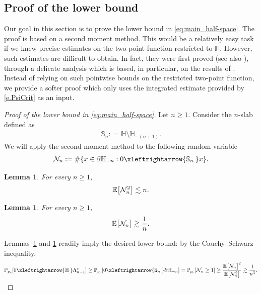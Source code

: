 \documentclass[11pt,a4paper]{article}
\numberwithin{equation}{section}
\theoremstyle{plain}
\newtheorem{Lem}[Thm]{Lemma}
\theoremstyle{definition}
\newcommand{\connect}{\xleftrightarrow}
\newcommand{\1}{\mathbf 1}
\def\H{\mathbb{H}}
\def\P{\mathbb{P}} %
\def\E{\mathbb{E}} %
\def\md{\mid}
\def\Bb#1#2{{\def\md{\bigm| }#1\bigl[#2\bigr]}}
\def\Eb{\Bb\E}
\def \p {{\partial}}
\def\bf{\bfseries}
\begin{document}
\subsection{Proof of the lower bound}

Our goal in this section is to prove the lower bound in \eqref{eq:main_half-space}.
The proof is based on a second moment method. This would be a relatively easy task if we knew precise estimates on the two point function restricted to $\H$. However, such estimates are difficult to obtain. In fact, they were first proved \cite{ChatterjeeHanson} (see also \cite{ChatterjeeHansonSosoe2023subcritical}), through a delicate analysis which is based, in particular, on the results of \cite{KozmaNachmias}.
Instead of relying on such pointwise bounds on the restricted two-point function, we provide a softer proof which only uses the integrated estimate provided by \eqref{e.PsiCrit} as an input. 

\medskip

\noindent
\begin{proof}[Proof of the lower bound in \eqref{eq:main_half-space}] Let $n\geq 1$.
	Consider the $n$-slab defined as
	\begin{align}\label{}
		\mathbb{S}_n: = \H \setminus \H_{-(n+1)}.
	\end{align}
	We will apply the second moment method to the following random variable 
	\begin{align}\label{}
		\mathcal N_n:= \# \{ x \in  \p \H_{-n}:  0\connect{\mathbb S_n\:} x  \}.
	\end{align}
	
	\begin{Lem}\label{l.N2}
		For every $n\geq1$,
		\begin{align}\label{}
			\Eb{\mathcal N_n^2} \lesssim n.
		\end{align}
	\end{Lem}
	
	\begin{Lem}\label{l.N1}
		For every $n\geq1$,
		\begin{align}\label{}
			\Eb{\mathcal N_n} \gtrsim \frac{1}{n}.
		\end{align}
	\end{Lem}
	
	Lemmas~\ref{l.N2} and \ref{l.N1} readily imply the desired lower bound: by the Cauchy--Schwarz inequality,
	\begin{align}\label{}
		\P_{p_c}[0\connect{\mathbb H\:} \Lambda_{n-1}^c] \geq \P_{p_c}[0\connect{\mathbb{S}_n\:} \partial \H_{-n}] 
		= \P_{p_c}[ \mathcal N_n \geq 1] 
		\geq \frac {\Eb{\mathcal N_n}^2} {\Eb{\mathcal N_n^2}}  \gtrsim \frac{1}{n^3}.
	\end{align}
\end{proof} 
\end{document}
